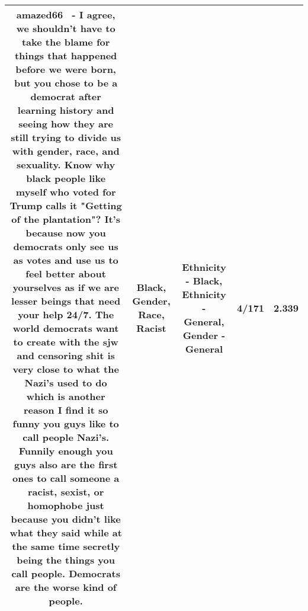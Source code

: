 \documentclass[11pt]{article}
\newlength\mylength
\begin{document}
\begin{center}
\begin{longtable}{|C{.65\mylength}|C{.30\mylength}|C{.12\mylength}|C{.12\mylength}|C{.12\mylength}|}
  \small amazed66  - I agree, we shouldn't have to take the blame for things that happened before we were born, but you chose to be a democrat after learning history and seeing how they are still trying to divide us with \textbf{gender}, \textbf{race}, and sexuality. Know why \textbf{black} people like myself who voted for Trump calls it "Getting of the plantation"? It's because now you democrats only see us as votes and use us to feel better about yourselves as if we are lesser beings that need your help 24/7. The world democrats want to create with the sjw and censoring shit is very close to what the Nazi's used to do which is another reason I find it so funny you guys like to call people Nazi's. Funnily enough you guys also are the first ones to call someone a \textbf{racist}, sexist, or homophobe just because you didn't like what they said while at the same time secretly being the things you call people. Democrats are the worse kind of people.\normalsize   & Black, Gender, Race, Racist & Ethnicity - Black, Ethnicity - General, Gender - General & 4/171 & 2.339 \\  \hline

\end{longtable}
\end{center}
\end{document}
